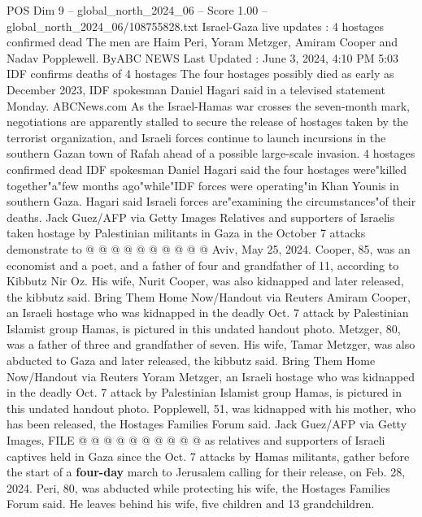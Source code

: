 \begin{textsample}{POS Dim 9 – global\_north\_2024\_06 – Score 1.00 – global\_north\_2024\_06/108755828.txt}  \label{ex:f9_pos_289}
Israel-Gaza live updates : 4 hostages confirmed dead The men are Haim Peri, Yoram Metzger, Amiram Cooper and Nadav Popplewell.
ByABC NEWS Last Updated : June 3, 2024, 4:10 PM 5:03 IDF confirms deaths of 4 hostages The four hostages possibly died as early as December 2023, IDF spokesman Daniel Hagari said in a televised statement Monday.
ABCNews.com As the Israel-Hamas war crosses the seven-month mark, negotiations are apparently stalled to secure the release of hostages taken by the terrorist organization, and Israeli forces continue to launch incursions in the southern Gazan town of Rafah ahead of a possible large-scale invasion. 4 hostages confirmed dead IDF spokesman Daniel Hagari said the four hostages were"killed together"a"few months ago"while"IDF forces were operating"in Khan Younis in southern Gaza.
Hagari said Israeli forces are"examining the circumstances"of their deaths.
Jack Guez/AFP via Getty Images Relatives and supporters of Israelis taken hostage by Palestinian militants in Gaza in the October 7 attacks demonstrate to @ @ @ @ @ @ @ @ @ @ Aviv, May 25, 2024.
Cooper, 85, was an economist and a poet, and a father of four and grandfather of 11, according to Kibbutz Nir Oz.
His wife, Nurit Cooper, was also kidnapped and later released, the kibbutz said.
Bring Them Home Now/Handout via Reuters Amiram Cooper, an Israeli hostage who was kidnapped in the deadly Oct. 7 attack by Palestinian Islamist group Hamas, is pictured in this undated handout photo.
Metzger, 80, was a father of three and grandfather of seven.
His wife, Tamar Metzger, was also abducted to Gaza and later released, the kibbutz said.
Bring Them Home Now/Handout via Reuters Yoram Metzger, an Israeli hostage who was kidnapped in the deadly Oct. 7 attack by Palestinian Islamist group Hamas, is pictured in this undated handout photo.
Popplewell, 51, was kidnapped with his mother, who has been released, the Hostages Families Forum said.
Jack Guez/AFP via Getty Images, FILE @ @ @ @ @ @ @ @ @ @ as relatives and supporters of Israeli captives held in Gaza since the Oct. 7 attacks by Hamas militants, gather before the start of a \textbf{four-day} march to Jerusalem calling for their release, on Feb. 28, 2024.
Peri, 80, was abducted while protecting his wife, the Hostages Families Forum said.
He leaves behind his wife, five children and 13 grandchildren.

\end{textsample}
